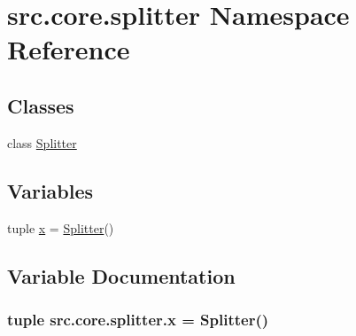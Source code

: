 \hypertarget{namespacesrc_1_1core_1_1splitter}{}\section{src.\+core.\+splitter Namespace Reference}
\label{namespacesrc_1_1core_1_1splitter}
\subsection*{Classes}
\begin{DoxyCompactItemize}
\item 
class \hyperlink{classsrc_1_1core_1_1splitter_1_1Splitter}{Splitter}
\end{DoxyCompactItemize}
\subsection*{Variables}
\begin{DoxyCompactItemize}
\item 
tuple \hyperlink{namespacesrc_1_1core_1_1splitter_a8c1e58967080e1810d575c49929a63fb}{x} = \hyperlink{classsrc_1_1core_1_1splitter_1_1Splitter}{Splitter}()
\end{DoxyCompactItemize}


\subsection{Variable Documentation}
\hypertarget{namespacesrc_1_1core_1_1splitter_a8c1e58967080e1810d575c49929a63fb}{}
\subsubsection[{x}]{\setlength{\rightskip}{0pt plus 5cm}tuple src.\+core.\+splitter.\+x = {\bf Splitter}()}\label{namespacesrc_1_1core_1_1splitter_a8c1e58967080e1810d575c49929a63fb}
